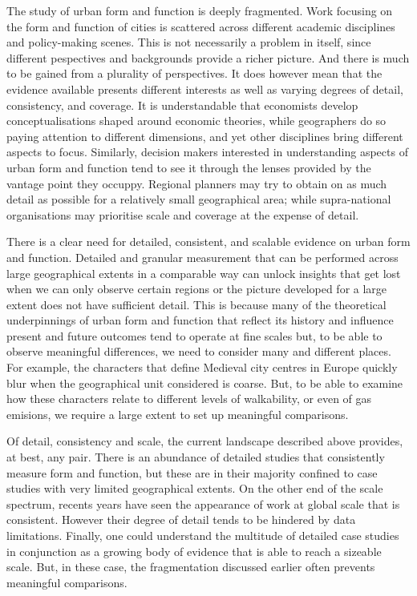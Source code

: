 The study of urban form and function is deeply fragmented.
Work focusing on the form and function of cities is scattered across
different academic disciplines and policy-making scenes. This is not
necessarily a problem in itself, since different pespectives and backgrounds
provide a richer picture. And there is much to be gained from a plurality of
perspectives.
%
It does however mean that the evidence available presents different 
interests as well as varying degrees of detail, consistency, and coverage.
It is understandable that economists develop conceptualisations shaped around
economic theories, while geographers do so paying attention to different
dimensions, and yet other disciplines bring different aspects to focus.
Similarly, decision makers interested in understanding aspects of urban form
and function tend to see it through the lenses provided by the vantage point
they occuppy. Regional planners may try to obtain on as much detail as
possible for a relatively small geographical area; while supra-national
organisations may prioritise scale and coverage at the expense of detail.

There is a clear need for detailed, consistent, and scalable evidence on urban
form and function.
Detailed and granular measurement that can be performed across large
geographical extents in a comparable way can unlock insights that get lost
when we can only observe certain regions or the picture developed for a large
extent does not have sufficient detail. 
%
This is because many of the
theoretical underpinnings of urban form and function that reflect its history
and influence present and future outcomes tend to operate at fine scales but,
to be able to observe meaningful differences, we need to consider many and
different places.
%
For example, the characters that define Medieval city centres in Europe
quickly blur when the geographical unit considered is coarse. But, to be able to
examine how these characters relate to different levels of walkability, or
even of gas emisions, we require a large extent to set up meaningful
comparisons.

Of detail, consistency and scale, the current landscape described above
provides, at best, any pair.
%
There is an abundance of detailed studies that consistently measure form and
function, but these are in their majority confined to case studies with very
limited geographical extents.
%
On the other end of the scale spectrum, recents years have seen the appearance
of work at global scale that is consistent. However their degree of detail
tends to be hindered by data limitations.
%
Finally, one could understand the multitude of detailed case studies in
conjunction as a growing body of evidence that is able to reach a sizeable
scale. But, in these case, the fragmentation discussed earlier often prevents
meaningful comparisons.

